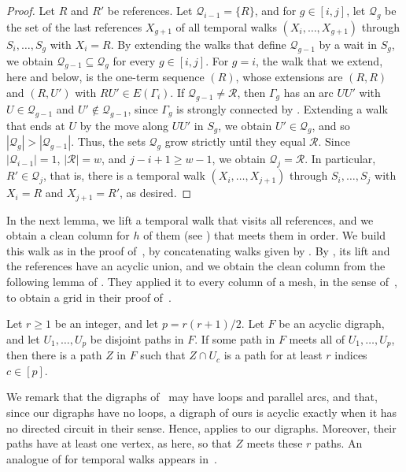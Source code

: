 \documentclass[fontsize=12pt,leading=14pt]{fullpaper}
\newcommand{\Qcal}{\mathcal{Q}}
\newcommand{\Rcal}{\mathcal{R}}
\begin{document}
\begin{proof}
  Let $R$ and $R'$ be references.
  Let $\Qcal_{i-1}=\{R\}$, and for $g\in[i,j]$, let $\Qcal_g$ be the set of the last references $X_{g+1}$ of all temporal walks $(X_i,\dots,X_{g+1})$ through $S_i,\dots,S_g$ with $X_i=R$.
  By extending the walks that define $\Qcal_{g-1}$ by a wait in $S_g$, we obtain $\Qcal_{g-1}\subseteq\Qcal_g$ for every $g\in[i,j]$.
  For $g=i$, the walk that we extend, here and below, is the one-term sequence $(R)$, whose extensions are $(R,R)$ and $(R,U')$ with $RU'\in E(\Gamma_i)$.
  If $\Qcal_{g-1}\ne\Rcal$, then $\Gamma_g$ has an arc $UU'$ with $U\in\Qcal_{g-1}$ and $U'\notin\Qcal_{g-1}$, since $\Gamma_g$ is strongly connected by .
  Extending a walk that ends at $U$ by the move along $UU'$ in $S_g$, we obtain $U'\in\Qcal_g$, and so $|\Qcal_g|>|\Qcal_{g-1}|$.
  Thus, the sets $\Qcal_g$ grow strictly until they equal $\Rcal$.
  Since $|\Qcal_{i-1}|=1$, $|\Rcal|=w$, and $j-i+1\ge w-1$, we obtain $\Qcal_j=\Rcal$.
  In particular, $R'\in\Qcal_j$, that is, there is a temporal walk $(X_i,\dots,X_{j+1})$ through $S_i,\dots,S_j$ with $X_i=R$ and $X_{j+1}=R'$, as desired.
\end{proof}

In the next lemma, we lift a temporal walk that visits all references, and we obtain a clean column for $h$ of them (see ) that meets them in order.
We build this walk as in the proof of~\cite[Lemma~6.19]{HKMM26a}, by concatenating walks given by .
By , its lift and the references have an acyclic union, and we obtain the clean column from the following lemma of \textcite{ReedRST96}.
They applied it to every column of a mesh, in the sense of~\cite[Section~4]{ReedRST96}, to obtain a grid in their proof of~\cite[(4.5)]{ReedRST96}.

\begin{proposition}\label{prop:rrst-column}
  Let $r\ge1$ be an integer, and let $p=r(r+1)/2$.
  Let $F$ be an acyclic digraph, and let $U_1,\dots,U_p$ be disjoint paths in $F$.
  If some path in $F$ meets all of $U_1,\dots,U_p$, then there is a path $Z$ in $F$ such that $Z\cap U_c$ is a path for at least $r$ indices $c\in[p]$.
\end{proposition}

We remark that the digraphs of~\cite{ReedRST96} may have loops and parallel arcs, and that, since our digraphs have no loops, a digraph of ours is acyclic exactly when it has no directed circuit in their sense.
Hence,  applies to our digraphs.
Moreover, their paths have at least one vertex, as here, so that $Z$ meets these $r$ paths.
An analogue of  for temporal walks appears in~\cite[Lemma~6.15]{HKMM26a}.
\end{document}
